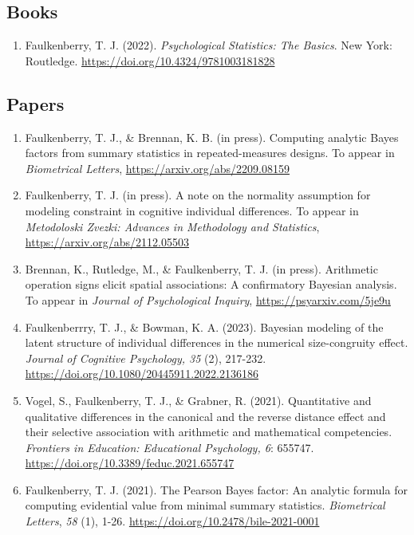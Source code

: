 \documentclass[article,10pt]{article}
\begin{document}
\subsection*{Books}
\label{sec:orgf99404d}
\begin{enumerate}
\item Faulkenberry, T. J. (2022). \emph{Psychological Statistics: The Basics}. New York: Routledge. \url{https://doi.org/10.4324/9781003181828}
\end{enumerate}

\subsection*{Papers}
\label{sec:org86eb3ce}
\begin{enumerate}
\item Faulkenberry, T. J., \& Brennan, K. B. (in press). Computing analytic Bayes factors from summary statistics in repeated-measures designs. To appear in \emph{Biometrical Letters},  \url{https://arxiv.org/abs/2209.08159}
\item Faulkenberry, T. J. (in press). A note on the normality assumption for modeling constraint in cognitive individual differences. To appear in \emph{Metodoloski Zvezki: Advances in Methodology and Statistics}, \url{https://arxiv.org/abs/2112.05503}
\item Brennan, K., Rutledge, M., \& Faulkenberry, T. J. (in press). Arithmetic operation signs elicit spatial associations: A confirmatory Bayesian analysis. To appear in \emph{Journal of Psychological Inquiry}, \url{https://psyarxiv.com/5je9u}
\item Faulkenberrry, T. J., \& Bowman, K. A. (2023). Bayesian modeling of the latent structure of individual differences in the numerical size-congruity effect. \emph{Journal of Cognitive Psychology, 35} (2), 217-232. \url{https://doi.org/10.1080/20445911.2022.2136186}
\item Vogel, S., Faulkenberry, T. J., \& Grabner, R. (2021). Quantitative and qualitative differences in the canonical and the reverse distance effect and their selective association with arithmetic and mathematical competencies. \emph{Frontiers in Education: Educational Psychology, 6}: 655747. \url{https://doi.org/10.3389/feduc.2021.655747}
\item Faulkenberry, T. J. (2021). The Pearson Bayes factor: An analytic formula for computing evidential value from minimal summary statistics. \emph{Biometrical Letters}, \emph{58} (1), 1-26. \url{https://doi.org/10.2478/bile-2021-0001}

\end{enumerate}
\end{document}
